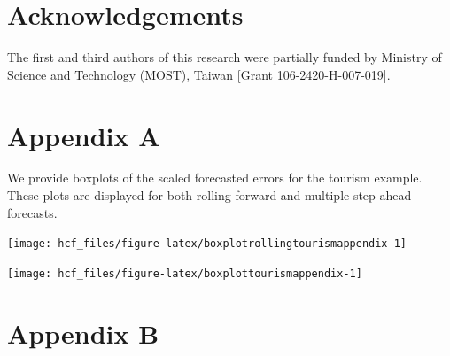 \documentclass[11pt,a4paper,]{article}
\let\origfigure\figure
\let\endorigfigure\endfigure
\renewenvironment{figure}[1][2] {
    \expandafter\origfigure\expandafter[!htbp]
} {
    \endorigfigure
}
\begin{document}
\hypertarget{acknowledgements}{%
\section*{Acknowledgements}\label{acknowledgements}}

The first and third authors of this research were partially funded by
Ministry of Science and Technology (MOST), Taiwan {[}Grant
106-2420-H-007-019{]}.

\clearpage

\hypertarget{appendixA}{%
\section*{Appendix A}\label{appendixA}}

We provide boxplots of the scaled forecasted errors for the tourism
example. These plots are displayed for both rolling forward and
multiple-step-ahead forecasts.

\begin{figure}

{\centering \texttt{[image: hcf\_files/figure-latex/boxplotrollingtourismappendix-1]} 

}

\caption{Box plots of scaled forecast errors from reconciled and unreconciled ETS, ARIMA and OLS methods at each hierarchical level for rolling origin 24-step-ahead tourism demand.}\label{fig:boxplotrollingtourismappendix}
\end{figure}

\begin{figure}

{\centering \texttt{[image: hcf\_files/figure-latex/boxplottourismappendix-1]} 

}

\caption{Box plots of scaled forecast errors from reconciled and unreconciled ETS, ARIMA and OLS methods at each hierarchical level for fixed origin 24-step-ahead tourism demand.}\label{fig:boxplottourismappendix}
\end{figure}

\clearpage

\clearpage

\hypertarget{appendixB}{%
\section*{Appendix B}\label{appendixB}}
\end{document}
